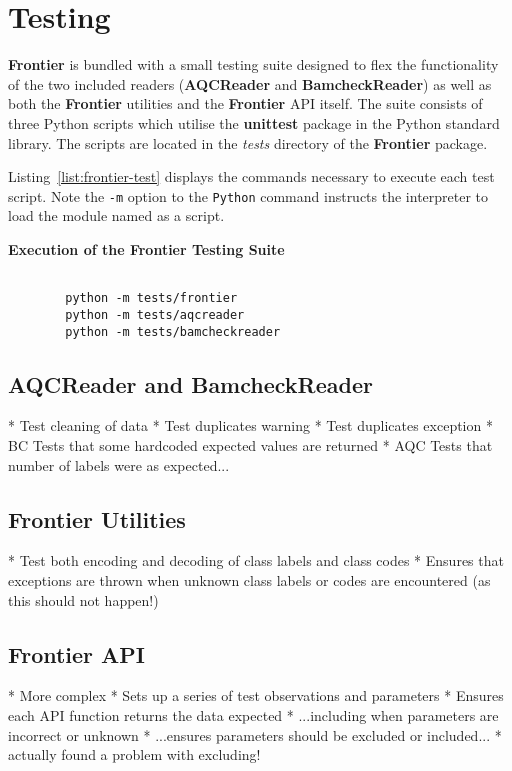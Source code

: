 \section{Testing}

\textbf{Frontier} is bundled with a small testing suite designed to flex the
functionality of the two included readers (\textbf{AQCReader} and
\textbf{BamcheckReader}) as well as both the \textbf{Frontier} utilities and
the \textbf{Frontier} API itself. The suite consists of three Python scripts
which utilise the \textbf{unittest} package in the Python standard library.
The scripts are located in the \textit{tests} directory of the
\textbf{Frontier} package.

Listing~\ref{list:frontier-test} displays the commands necessary to execute each
test script. Note the \texttt{-m} option to the \texttt{Python} command
instructs the interpreter to load the module named as a script.

\begin{listing}[H]
    \caption[frontier-test]{\textbf{Execution of the Frontier Testing Suite}}
    \label{list:frontier-test}
    \begin{verbatim}

        python -m tests/frontier
        python -m tests/aqcreader
        python -m tests/bamcheckreader
    \end{verbatim}
\end{listing}

\subsection{AQCReader and BamcheckReader}
* Test cleaning of data
* Test duplicates warning
* Test duplicates exception
* BC Tests that some hardcoded expected values are returned
* AQC Tests that number of labels were as expected...

\subsection{Frontier Utilities}
* Test both encoding and decoding of class labels and class codes
* Ensures that exceptions are thrown when unknown class labels or codes are
encountered (as this should not happen!)

\subsection{Frontier API}
* More complex
* Sets up a series of test observations and parameters
* Ensures each API function returns the data expected
* ...including when parameters are incorrect or unknown
* ...ensures parameters should be excluded or included...
* actually found a problem with excluding!




